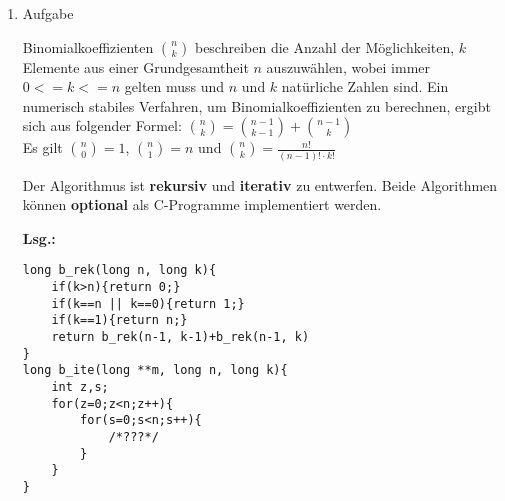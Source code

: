 \documentclass[12pt,a4paper]{scrreprt}
\newcommand{\Lsg}{\par \textbf{Lsg.: } \hfill}
\begin{document}
\begin{enumerate}
b.) Formulieren Sie ein Struktogramm zur Berechnung der Ackermannschen Funktion.
Der rekursive Algorithmus kann \textbf{optional} als C-Programm implementiert werden.

\Lsg

%

\begin{comment}
\end{comment}
%

\begin{lstlisting}
unsigned long long a(unsigned long long m, unsigned long long n){
	if(m==0ULL){return n+1ULL;}
	if(n==0ULL){return a(m-1ULL, 1ULL);}
	return a(m, a(m, n-1ULL));
	/* return ((m==0ULL)?return n+1ULL:((n==0ULL)?a(m-1ULL, 1ULL):a(m, a(m, n-1ULL)))); */
}
\end{lstlisting}


\item Aufgabe %

Binomialkoeffizienten $\binom{n}{k}$ beschreiben die Anzahl der Möglichkeiten, $k$ Elemente aus einer Grundgesamtheit $n$ auszuwählen, wobei immer $0 <= k <= n$ gelten muss und $n$ und $k$ natürliche Zahlen sind. Ein numerisch stabiles Verfahren, um Binomialkoeffizienten zu berechnen, ergibt sich aus folgender Formel:
$\binom{n}{k} = \binom{n-1}{k-1}+\binom{n-1}{k}$ \\
Es gilt $\binom{n}{0}=1$, $\binom{n}{1}=n$ und $\binom{n}{k}=\frac{n!}{(n-1)! \cdot k!}$

Der Algorithmus ist \textbf{rekursiv} und \textbf{iterativ} zu entwerfen. Beide Algorithmen können \textbf{optional} als C-Programme implementiert werden.

\Lsg


%

\begin{comment}
n ueber k mit einer matrix

iterativ
\begin{tabular}
0 & k	\\
n & 1 & 0 & 0 & 0	\\
  & ... & 1 & 1 & 0	\\
  & 1 & 2
\end{tabular}

\end{comment}

\begin{lstlisting}
long b_rek(long n, long k){
	if(k>n){return 0;}
	if(k==n || k==0){return 1;}
	if(k==1){return n;}
	return b_rek(n-1, k-1)+b_rek(n-1, k)
}
long b_ite(long **m, long n, long k){
	int z,s;
	for(z=0;z<n;z++){
		for(s=0;s<n;s++){
			/*???*/
		}
	}
}
\end{lstlisting}


\end{enumerate}
\end{document}
